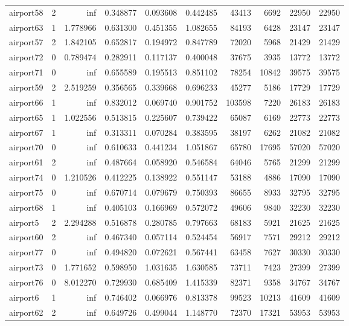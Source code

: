 \begin{longtable}{|l|r|r|r|r|r|r|r|r|r|}
airport58 & 2 & inf & 0.348877 & 0.093608 & 0.442485 & 43413 & 6692 & 22950 & 22950 \\
airport63 & 1 & 1.778966 & 0.631300 & 0.451355 & 1.082655 & 84193 & 6428 & 23147 & 23147 \\
airport57 & 2 & 1.842105 & 0.652817 & 0.194972 & 0.847789 & 72020 & 5968 & 21429 & 21429 \\
airport72 & 0 & 0.789474 & 0.282911 & 0.117137 & 0.400048 & 37675 & 3935 & 13772 & 13772 \\
airport71 & 0 & inf & 0.655589 & 0.195513 & 0.851102 & 78254 & 10842 & 39575 & 39575 \\
airport59 & 2 & 2.519259 & 0.356565 & 0.339668 & 0.696233 & 45277 & 5186 & 17729 & 17729 \\
airport66 & 1 & inf & 0.832012 & 0.069740 & 0.901752 & 103598 & 7220 & 26183 & 26183 \\
airport65 & 1 & 1.022556 & 0.513815 & 0.225607 & 0.739422 & 65087 & 6169 & 22773 & 22773 \\
airport67 & 1 & inf & 0.313311 & 0.070284 & 0.383595 & 38197 & 6262 & 21082 & 21082 \\
airport70 & 0 & inf & 0.610633 & 0.441234 & 1.051867 & 65780 & 17695 & 57020 & 57020 \\
airport61 & 2 & inf & 0.487664 & 0.058920 & 0.546584 & 64046 & 5765 & 21299 & 21299 \\
airport74 & 0 & 1.210526 & 0.412225 & 0.138922 & 0.551147 & 53188 & 4886 & 17090 & 17090 \\
airport75 & 0 & inf & 0.670714 & 0.079679 & 0.750393 & 86655 & 8933 & 32795 & 32795 \\
airport68 & 1 & inf & 0.405103 & 0.166969 & 0.572072 & 49606 & 9840 & 32230 & 32230 \\
airport5 & 2 & 2.294288 & 0.516878 & 0.280785 & 0.797663 & 68183 & 5921 & 21625 & 21625 \\
airport60 & 2 & inf & 0.467340 & 0.057114 & 0.524454 & 56917 & 7571 & 29212 & 29212 \\
airport77 & 0 & inf & 0.494820 & 0.072621 & 0.567441 & 63458 & 7627 & 30330 & 30330 \\
airport73 & 0 & 1.771652 & 0.598950 & 1.031635 & 1.630585 & 73711 & 7423 & 27399 & 27399 \\
airport76 & 0 & 8.012270 & 0.729930 & 0.685409 & 1.415339 & 82371 & 9358 & 34767 & 34767 \\
airport6 & 1 & inf & 0.746402 & 0.066976 & 0.813378 & 99523 & 10213 & 41609 & 41609 \\
airport62 & 2 & inf & 0.649726 & 0.499044 & 1.148770 & 72370 & 17321 & 53953 & 53953 \\

\end{longtable}
